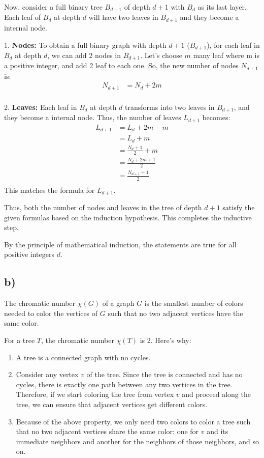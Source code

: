 \documentclass[12pt]{article}
\begin{document}
Now, consider a full binary tree \( B_{d+1} \) of depth \( d+1 \) with \( B_d \) as its last layer. Each leaf of \( B_d \) at depth \(d\) will have two leaves in \( B_{d+1} \) and they become a internal node.

1. \textbf{Nodes:} To obtain a full binary graph with depth \(d+1\) (\( B_{d+1} \)), for each leaf in \( B_d \) at depth \(d\), we can add 2 nodes in \( B_{d+1} \). Let's choose \(m\) many leaf where m is a positive integer, and add 2 leaf to each one. So, the new number of nodes \( N_{d+1} \) is:
\begin{align*}
N_{d+1} &= N_d + 2m \\
\end{align*}

2. \textbf{Leaves:} Each leaf in \( B_d \) at depth \(d\) transforms into two leaves in \( B_{d+1} \), and they become a internal node. Thus, the number of leaves \( L_{d+1} \) becomes:
\begin{align*}
L_{d+1} &= L_d + 2m - m\\
&= L_d + m \\
&= \frac{N_d + 1}{2} + m \\
&= \frac{N_d + 2m + 1}{2} \\
&= \frac{N_{d+1} + 1}{2} \\
\end{align*}
This matches the formula for \( L_{d+1} \).

Thus, both the number of nodes and leaves in the tree of depth \( d+1 \) satisfy the given formulas based on the induction hypothesis. This completes the inductive step.

By the principle of mathematical induction, the statements are true for all positive integers \( d \).


\subsection*{b)}

The chromatic number \( \chi(G) \) of a graph \( G \) is the smallest number of colors needed to color the vertices of \( G \) such that no two adjacent vertices have the same color.

For a tree \( T \), the chromatic number \( \chi(T) \) is 2. Here's why:

\begin{enumerate}
    \item A tree is a connected graph with no cycles.
    \item Consider any vertex \( v \) of the tree. Since the tree is connected and has no cycles, there is exactly one path between any two vertices in the tree. Therefore, if we start coloring the tree from vertex \( v \) and proceed along the tree, we can ensure that adjacent vertices get different colors.
    \item Because of the above property, we only need two colors to color a tree such that no two adjacent vertices share the same color: one for \( v \) and its immediate neighbors and another for the neighbors of those neighbors, and so on.
\end{enumerate}
\end{document}

